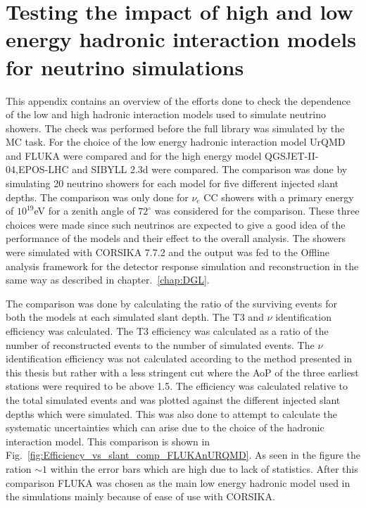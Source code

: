 \chapter{Testing the impact of high and low energy hadronic interaction models for neutrino simulations}
\label{sec:app_2}
This appendix contains an overview of the efforts done to check the dependence of the low and high hadronic interaction models used to simulate neutrino showers. The check was performed before the full library was simulated by the MC task. For the choice of the low energy hadronic interaction model UrQMD and FLUKA were compared and for the high energy model QGSJET-II-04,EPOS-LHC and SIBYLL 2.3d  were compared. The comparison was done by simulating 20 neutrino showers for each model for five different injected slant depths. The comparison was only done for $\nu_e$ CC showers with a primary energy of $10^{19}$eV for a zenith angle of $72^\circ$ was considered for the comparison. These three choices were made since such neutrinos are expected to give a good idea of the performance of the models and their effect to the overall analysis. The showers were simulated with CORSIKA 7.7.2 and the output was fed to the Offline analysis framework for the detector response simulation and reconstruction in the same way as described in chapter.~\ref{chap:DGL}. 

The comparison was done by calculating the ratio of the surviving events for both the models at each simulated slant depth. The T3 and $\nu$ identification efficiency was calculated. The T3 efficiency was calculated as a ratio of the number of reconstructed events to the number of simulated events. The $\nu$ identification efficiency was not calculated according to the method presented in this thesis but rather with a less stringent cut where the AoP of the three earliest stations were required to be above 1.5. The efficiency was calculated relative to the total simulated events and was plotted against the different injected slant depths which were simulated. This was also done to attempt to calculate the systematic uncertainties which can arise due to the choice of the hadronic interaction model. This comparison is shown in Fig.~\ref{fig:Efficiency_vs_slant_comp_FLUKAnURQMD}. As seen in the figure the ration $\sim 1$ within the error bars which are high due to lack of statistics. After this comparison FLUKA was chosen as the main low energy hadronic model used in the simulations mainly because of ease of use with CORSIKA. 

